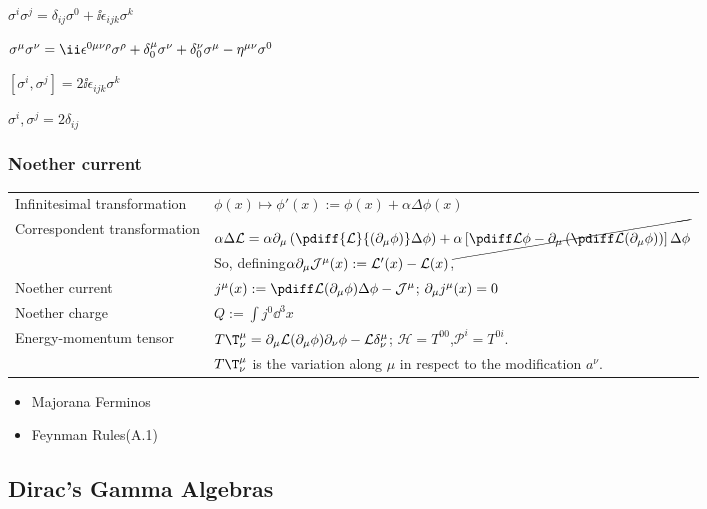 $\sigma^i\sigma^j=\delta_{ij}\sigma^0+\ii\epsilon_{ijk}\sigma^k$

$\Sm\Sn=\ii\epsilon^{0\mu\nu\rho}\Sr+\delta^\mu_0\Sn+\delta^\nu_0\Sm-\Hmn\sigma^0$

$[\sigma^i,\sigma^j]=2\ii\epsilon_{ijk}\sigma^k$

${\sigma^i,\sigma^j}=2\delta_{ij}$


\subsubsection{Noether current}
\begin{tabular}{l@{ :\ \ \ }l}
Infinitesimal transformation & $\phi(x)\mapsto \phi'(x):=\phi(x)+\alpha\Delta\phi(x)$\\
Correspondent transformation & $\alpha\Delta\Lag = \alpha\Pm\left(\pdiff{\Lag}{(\Pm\phi)}\Delta\phi\right)+\cancel{\alpha\left[\pdiff\Lag\phi-\Pm\left(\pdiff\Lag{(\Pm\phi)}\right)\right]\Delta\phi}$\\
                             & So, defining\quad $\alpha\partial_\mu\mathcal J^\mu(x):={\mathcal L}'(x)-{\mathcal L}(x)$,\\
Noether current              & $j^\mu(x):=\pdiff\Lag{(\Pm\phi)}\Delta\phi-\mathcal J^\mu$;\qquad
                               $\partial_\mu j^\mu(x)=0$\\
Noether charge               & $Q:=\int j^0\dd^3x$\\
Energy-momentum tensor       & $T\T^\mu_\nu=\Pm\Lag{(\Pm\phi)}\Pn\phi-\Lag\delta^\mu_\nu$;\quad
$\mathcal H=T^{00}$,\quad $\mathcal P^i =T^{0i}$.\\
&$T\T^\mu_\nu$ is the variation along $\mu$ in respect to the modification $a^\nu$.\\
\end{tabular}



\begin{itemize}
 \item Majorana Ferminos
 \item Feynman Rules(A.1)
\end{itemize}

\newpage

\subsection{Dirac's Gamma Algebras}
